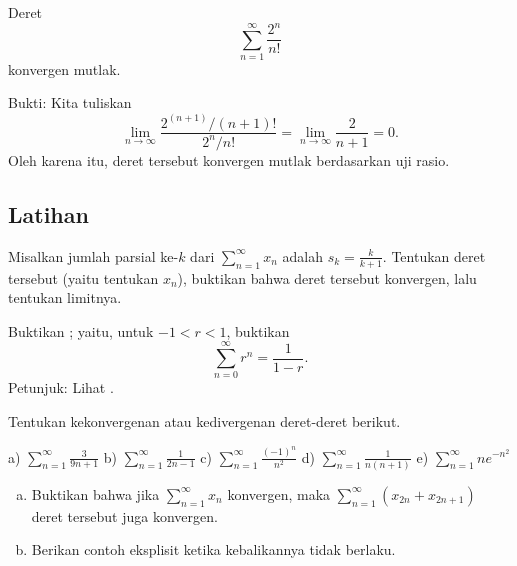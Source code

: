 \begin{example}
Deret
\begin{equation*}
\sum_{n=1}^\infty \frac{2^n}{n!}
\end{equation*}
konvergen mutlak.

Bukti: Kita tuliskan
\begin{equation*}
\lim_{n\to\infty} \frac{2^{(n+1)}/(n+1)!}{2^n / n!} =
\lim_{n\to\infty} \frac{2}{n+1} = 0 .
\end{equation*}
Oleh karena itu, deret tersebut konvergen mutlak berdasarkan uji rasio.
\end{example}

\subsection{Latihan}

\begin{exercise}
Misalkan jumlah parsial ke-$k$ dari $\displaystyle \sum_{n=1}^\infty x_n$ adalah $s_k = \frac{k}{k+1}$.
Tentukan deret tersebut (yaitu tentukan $x_n$), buktikan bahwa deret tersebut konvergen, lalu
tentukan limitnya.
\end{exercise}

\begin{exercise} \label{geometric:exr}
Buktikan ; yaitu, untuk $-1 < r < 1$, buktikan
\begin{equation*}
\sum_{n=0}^\infty r^n = \frac{1}{1-r} .
\end{equation*}
Petunjuk: Lihat .
\end{exercise}

\begin{exercise}
Tentukan kekonvergenan atau kedivergenan deret-deret berikut.

\medskip

\noindent
a)
$\displaystyle \sum_{n=1}^\infty \frac{3}{9n+1}$
\qquad
b)
$\displaystyle \sum_{n=1}^\infty \frac{1}{2n-1}$
\qquad
c)
$\displaystyle \sum_{n=1}^\infty \frac{{(-1)}^n}{n^2}$
\qquad
d)
$\displaystyle \sum_{n=1}^\infty \frac{1}{n(n+1)}$
\qquad
e)
$\displaystyle \sum_{n=1}^\infty n e^{-n^2}$
\end{exercise}

\begin{samepage}
\begin{exercise}
\leavevmode
\begin{enumerate}[a)]
\item Buktikan bahwa jika
$\displaystyle
\sum_{n=1}^\infty x_n
$
konvergen, maka
$\displaystyle
\sum_{n=1}^\infty ( x_{2n} + x_{2n+1} )
$
deret tersebut juga konvergen.
\item
Berikan contoh eksplisit ketika kebalikannya tidak berlaku.
\end{enumerate}
\end{exercise}
\end{samepage}

